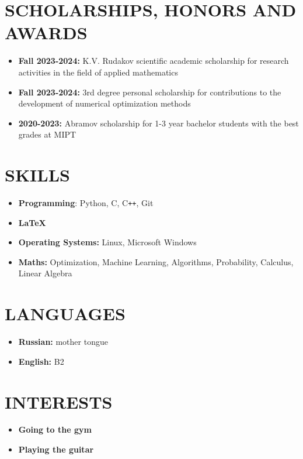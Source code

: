 \documentclass[11pt]{moderncv}
\begin{document}
    \section{SCHOLARSHIPS, HONORS AND AWARDS}

        \begin{itemize}
            \item \textbf{Fall 2023-2024:} K.V. Rudakov scientific academic scholarship for research activities in the field of applied mathematics
            \item \textbf{Fall 2023-2024:} 3rd degree personal scholarship for contributions to the development of numerical optimization methods
            \item \textbf{2020-2023:} Abramov scholarship for 1-3 year bachelor students with the best grades at MIPT
        \end{itemize}

    \section{SKILLS}
    
        \begin{itemize}
            \item \textbf{Programming}: Python, C, C\texttt{++}, Git
            \item \textbf{\LaTeX}
            \item \textbf{Operating Systems:} Linux, Microsoft Windows
            \item \textbf{Maths:} Optimization, Machine Learning, Algorithms, Probability, Calculus, Linear Algebra
        \end{itemize}

    \section{LANGUAGES}

        \begin{itemize}
            \item \textbf{Russian:} mother tongue
            \item \textbf{English:} B2
        \end{itemize}

    \section{INTERESTS}

        \begin{itemize}
            \item \textbf{Going to the gym}
            \item \textbf{Playing the guitar}
        \end{itemize}

    

    
\end{document}
